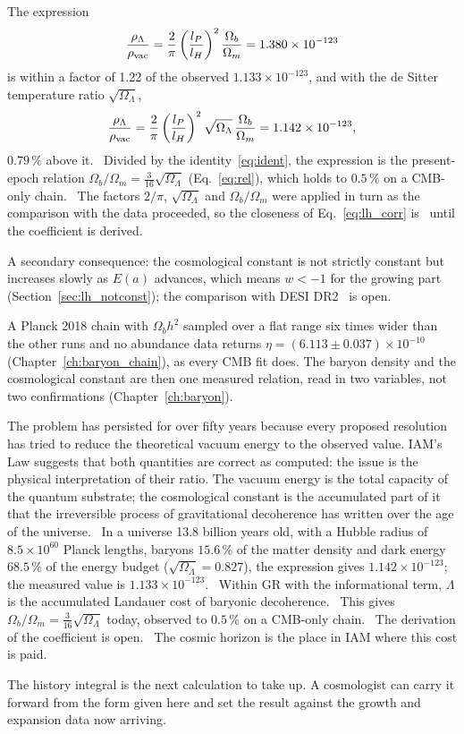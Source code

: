 The expression
\begin{equation}
\frac{\rho_\Lambda}{\rho_{\rm vac}}=\frac{2}{\pi}\left(\frac{l_P}{l_H}\right)^2\frac{\Omega_b}{\Omega_m}=1.380\times10^{-123}\label{eq:lh_base}
\end{equation}
is within a factor of 1.22 of the observed $1.133\times10^{-123}$, and with the de Sitter temperature ratio $\sqrt{\Omega_\Lambda}$,
\begin{equation}
\frac{\rho_\Lambda}{\rho_{\rm vac}}=\frac{2}{\pi}\left(\frac{l_P}{l_H}\right)^2\sqrt{\Omega_\Lambda}\,\frac{\Omega_b}{\Omega_m}=1.142\times10^{-123},
\label{eq:lh_corr}\end{equation}
$0.79\,\%$ above it. \calc\ Divided by the identity~\eqref{eq:ident}, the expression is the present-epoch relation
$\Omega_b/\Omega_m=\tfrac{3}{16}\sqrt{\Omega_\Lambda}$ (Eq.~\eqref{eq:rel}), which holds to $0.5\,\%$ on a CMB-only chain. \observed\
The factors $2/\pi$, $\sqrt{\Omega_\Lambda}$ and $\Omega_b/\Omega_m$ were applied in turn as the comparison with the data proceeded, so
the closeness of Eq.~\eqref{eq:lh_corr} is \fitted\ until the coefficient is derived. \openprob

A secondary consequence: the cosmological constant is not strictly constant but increases slowly as $E(a)$ advances, which means
$w<-1$ for the growing part (Section~\ref{sec:lh_notconst}); the comparison with DESI DR2~\cite{DESI2025} is open. \derived\
\openprob

A Planck 2018 chain with $\Omega_bh^2$ sampled over a flat range six times wider than the other runs and no abundance data returns
$\eta=(6.113\pm0.037)\times10^{-10}$ (Chapter~\ref{ch:baryon_chain}), as every CMB fit does. The baryon density and the cosmological
constant are then one measured relation, read in two variables, not two confirmations (Chapter~\ref{ch:baryon}). \observed

The problem has persisted for over fifty years because every proposed resolution has tried to reduce the theoretical vacuum energy to
the observed value. IAM's Law suggests that both quantities are correct as computed: the issue is the physical interpretation of their
ratio. The vacuum energy is the total capacity of the quantum substrate; the cosmological constant is the accumulated part of it that the
irreversible process of gravitational decoherence has written over the age of the universe. \interp\ In a universe 13.8 billion years old,
with a Hubble radius of $8.5\times10^{60}$ Planck lengths, baryons $15.6\,\%$ of the matter density and dark energy $68.5\,\%$ of the
energy budget ($\sqrt{\Omega_\Lambda}=0.827$), the expression gives $1.142\times10^{-123}$; the measured value is $1.133\times10^{-123}$.
\calc\ Within GR with the informational term, $\Lambda$ is the accumulated Landauer cost of baryonic decoherence. \conjecture\ This
gives $\Omega_b/\Omega_m=\tfrac3{16}\sqrt{\Omega_\Lambda}$ today, observed to $0.5\,\%$ on a CMB-only chain. \observed\ The derivation
of the coefficient is open. \openprob\ The cosmic horizon is the place in IAM where this cost is paid.

The history integral is the next calculation to take up. A cosmologist can carry it forward from the form given here and set the result against the growth and expansion data now arriving.
